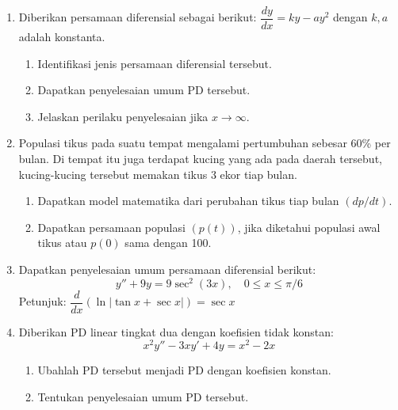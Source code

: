\documentclass[10pt,openany,a4paper]{article}
\renewcommand{\headrulewidth}{0pt}
\begin{document}
\begin{enumerate}
  \item Diberikan persamaan diferensial sebagai berikut:
        $
          \dfrac{dy}{dx} = ky - ay^2
        $
        dengan $k, a$ adalah konstanta.

        \begin{enumerate}
          \item Identifikasi jenis persamaan diferensial tersebut.
          \item Dapatkan penyelesaian umum PD tersebut.
          \item Jelaskan perilaku penyelesaian jika $x\to \infty$.
        \end{enumerate}

  \item Populasi tikus pada suatu tempat mengalami pertumbuhan sebesar 60\% per bulan. Di tempat itu juga terdapat kucing yang ada pada daerah tersebut, kucing-kucing tersebut memakan tikus 3 ekor tiap bulan.

        \begin{enumerate}
          \item Dapatkan model matematika dari perubahan tikus tiap bulan $(dp/dt)$.
          \item Dapatkan persamaan populasi $(p(t))$, jika diketahui populasi awal tikus atau $p(0)$ sama dengan 100.
        \end{enumerate}

  \item Dapatkan penyelesaian umum persamaan diferensial berikut:
        \[
          y'' + 9y = 9 \sec^2(3x), \quad 0 \le x \le \pi/6
        \]
        Petunjuk:
        $
          \dfrac{d}{dx}(\ln|\tan x+\sec x|) = \sec x
        $

  \item Diberikan PD linear tingkat dua dengan koefisien tidak konstan:
        \[
          x^2y'' - 3xy' + 4y = x^2-2x
        \]

        \begin{enumerate}
          \item Ubahlah PD tersebut menjadi PD dengan koefisien konstan.
          \item Tentukan penyelesaian umum PD tersebut.
        \end{enumerate}
\end{enumerate}
\newpage
\fancyhead{}
\renewcommand{\headrulewidth}{1pt}
\fancyfoot{}
\end{document}
